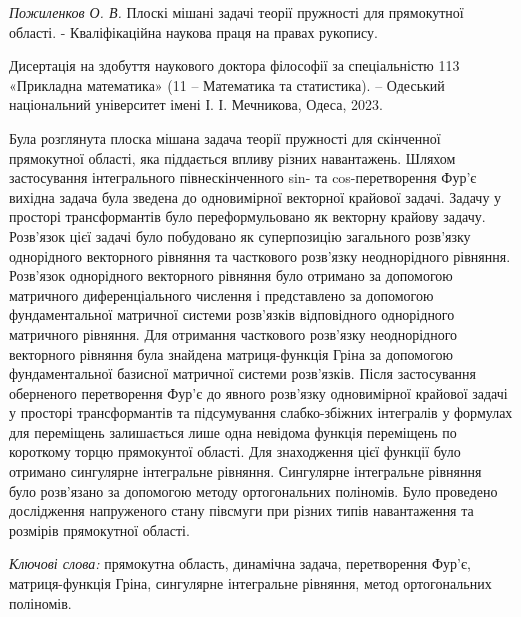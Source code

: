\textit{Пожиленков О. В.}
Плоскі мішані задачі теорії пружності для прямокутної області. - Кваліфікаційна наукова праця на правах рукопису.

Дисертація на здобуття наукового доктора філософії за спеціальністю 113 «Прикладна математика» (11 – Математика та статистика). – Одеський національний університет імені І. І. Мечникова, Одеса, 2023.


Була розглянута плоска мішана задача теорії пружності для скінченної прямокутної області, яка піддається впливу різних навантажень.
Шляхом застосування інтегрального півнескінченного sin- та cos-перетворення Фур'є вихідна задача була зведена до одновимірної векторної крайової задачі.
Задачу у просторі трансформантів було переформульовано як векторну крайову задачу.
Розв'язок цієї задачі було побудовано як суперпозицію загального розв'язку однорідного векторного рівняння та часткового розв'язку неоднорідного рівняння.
Розв'язок однорідного векторного рівняння було отримано за допомогою матричного диференціального числення і представлено за допомогою фундаментальної матричної системи розв'язків відповідного однорідного матричного рівняння.
Для отримання часткового розв'язку неоднорідного векторного рівняння була знайдена матриця-функція Гріна за допомогою фундаментальної базисної матричної системи розв'язків.
Після застосування оберненого перетворення Фур'є до явного розв'язку одновимірної крайової задачі у просторі трансформантів та підсумування слабко-збіжних інтегралів у формулах для переміщень залишається лише одна невідома функція переміщень по короткому торцю прямокунтої області.
Для знаходження цієї функції було отримано сингулярне інтегральне рівняння.
Сингулярне інтегральне рівняння було розв'язано за допомогою методу ортогональних поліномів.
Було проведено дослідження напруженого стану півсмуги при різних типів навантаження та розмірів прямокутної області.

\textit{Ключові слова:}
прямокутна область, динамічна задача, перетворення Фур’є, матриця-функція Гріна, сингулярне інтегральне рівняння, метод ортогональних поліномів.
